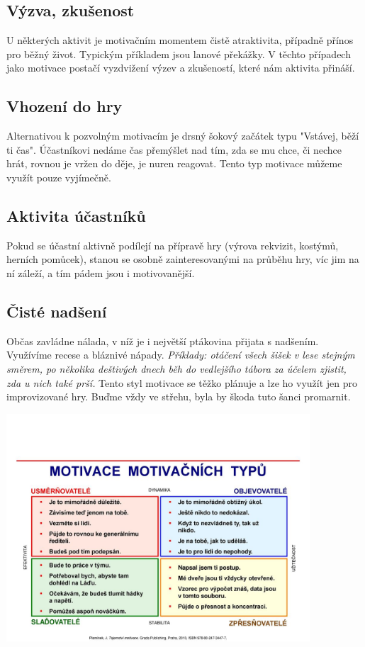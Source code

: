 \documentclass[a4paper,12pt]{report}
\begin{document}
\subsection*{Výzva, zkušenost}
U některých aktivit je motivačním momentem čistě atraktivita, případně přínos pro běžný život. Typickým příkladem jsou lanové překážky. V těchto případech jako motivace postačí vyzdvižení výzev a zkušeností, které nám aktivita přináší.

\subsection*{Vhození do hry}
Alternativou k pozvolným motivacím je drsný šokový začátek typu "Vstávej, běží ti čas". Účastníkovi nedáme čas přemýšlet nad tím, zda se mu chce, či nechce hrát, rovnou je vržen do děje, je nuren reagovat. Tento typ motivace můžeme využít pouze vyjímečně.

\subsection*{Aktivita účastníků}
Pokud se účastní aktivně podílejí na přípravě hry (výrova rekvizit, kostýmů, herních pomůcek), stanou se osobně zainteresovanými na průběhu hry, víc jim na ní záleží, a tím pádem jsou i motivovanější.

\subsection*{Čisté nadšení}
Občas zavládne nálada, v níž je i největší ptákovina přijata s nadšením. Využívíme recese a bláznivé nápady. 
\textit{Příklady: otáčení všech šišek v lese stejným směrem, po několika deštivých dnech běh do vedlejšího tábora za účelem zjistit, zda u nich také prší.}
Tento styl motivace se těžko plánuje a lze ho využít jen pro improvizované hry. Buďme vždy ve střehu, byla by škoda tuto šanci promarnit.

\begin{center}
\includegraphics[width=0.85\textwidth]{zdroje/MOTIVACE+MOTIVAČNÍCH+TYPŮ.jpg}
\end{center}
\end{document}
